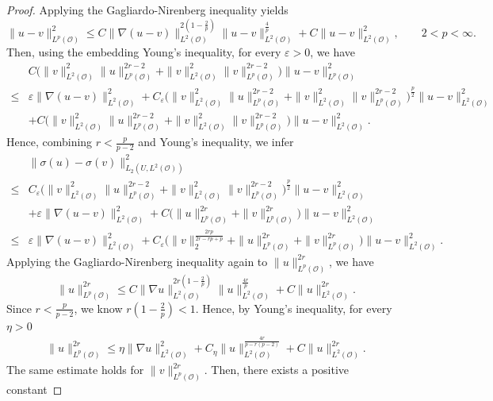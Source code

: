 \documentclass[reqno, 11pt]{amsart}
\theoremstyle{definition}
\numberwithin{equation}{section} \numberwithin{lem}{section}
\numberwithin{thm}{section} \numberwithin{prop}{section}
\numberwithin{cor}{section} \numberwithin{rem}{section}
\numberwithin{defn}{section}
\begin{document}
\begin{proof}
Applying the Gagliardo-Nirenberg inequality yields
\[
\|u-v\|_{L^p(\mathcal O)}^2
\le
C\|\nabla(u-v)\|_{L^2(\mathcal O)}^{2(1-\frac2p)}
\|u-v\|_{L^2(\mathcal O)}^{\frac4p}+C\|u-v\|_{L^2(\mathcal O)}^2,\qquad2< p<\infty.
\]
Then, using the embedding  Young's inequality, for every $\varepsilon>0$, we have
\begin{align*}
  & C\Big(\|v\|_{L^2(\mathcal O)}^2\|u\|_{L^p(\mathcal O)}^{2r-2}+\|v\|_{L^2(\mathcal O)}^2\|v\|_{L^p(\mathcal O)}^{2r-2}\Big)
\|u-v\|_{L^p(\mathcal O)}^2\\
\le&
\varepsilon \|\nabla(u-v)\|_{L^2(\mathcal O)}^2
+
C_\varepsilon \Big(\|v\|_{L^2(\mathcal O)}^2\|u\|_{L^p(\mathcal O)}^{2r-2}+\|v\|_{L^2(\mathcal O)}^2\|v\|_{L^p(\mathcal O)}^{2r-2}\Big)^\frac{p}{2} \|u-v\|_{L^2(\mathcal O)}^2\\&+C\Big(\|v\|_{L^2(\mathcal O)}^2\|u\|_{L^p(\mathcal O)}^{2r-2}+\|v\|_{L^2(\mathcal O)}^2\|v\|_{L^p(\mathcal O)}^{2r-2}\Big)\|u-v\|_{L^2(\mathcal O)}^2. 
\end{align*}
Hence, combining $r<\frac{p}{p-2}$ and Young's inequality,  we infer 
\begin{align*}
&\|\sigma(u)-\sigma(v)\|_{L_2(U,L^2(\mathcal O))}^2\\
\le&
C_\varepsilon\Big(\|v\|_{L^2(\mathcal O)}^2\|u\|_{L^p(\mathcal O)}^{2r-2}+\|v\|_{L^2(\mathcal O)}^2\|v\|_{L^p(\mathcal O)}^{2r-2}\Big)^\frac{p}{2}
\|u-v\|_{L^2(\mathcal O)}^2\\
&
+\varepsilon \|\nabla(u-v)\|_{L^2(\mathcal O)}^2+C\Big(\|u\|_{L^p(\mathcal O)}^{2r}+\|v\|_{L^p(\mathcal O)}^{2r}\Big)
\|u-v\|_{L^2(\mathcal O)}^2
\\
\le & \varepsilon \|\nabla(u-v)\|_{L^2(\mathcal O)}^2+C_\varepsilon \Big(\|v\|_2^{\frac{2rp}{2r-rp+p}}+\|u\|_{L^p(\mathcal O)}^{2r}+\|v\|_{L^p(\mathcal O)}^{2r}\Big)
\|u-v\|_{L^2(\mathcal O)}^2.
\end{align*}
Applying the Gagliardo-Nirenberg inequality again to $\|u\|_{L^p(\mathcal O)}^{2r}$, we have 
\[
\|u\|_{L^p(\mathcal O)}^{2r}
\le
C\|\nabla u\|_{L^2(\mathcal O)}^{2r(1-\frac2p)}
\|u\|_{L^2(\mathcal O)}^{\frac{4r}{p}}+C\|u\|_{L^2(\mathcal{O})}^{2r}.
\]
Since $r<\frac{p}{p-2}$, we know $r\left(1-\frac{2}{p}\right)<1$. Hence,  by Young's inequality, for every $\eta>0$
\begin{align}\label{G-N}
    \|u\|_{L^p(\mathcal O)}^{2r}
\le
\eta\|\nabla u\|_{L^2(\mathcal O)}^2
+
C_\eta
\|u\|_{L^2(\mathcal O)}^{\frac{4r}{p-r(p-2)}}
+
C\|u\|_{L^2(\mathcal O)}^{2r}.
\end{align}
The same estimate holds for $\|v\|_{L^p(\mathcal O)}^{2r}$. Then, there exists a positive constant

\end{proof}
\end{document}
